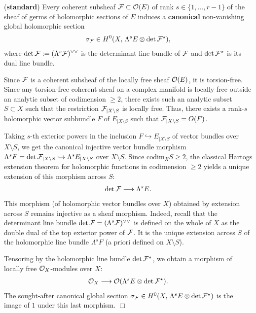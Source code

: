 \documentclass[12pt]{article}
\begin{document}
\begin{Fact} ({\bf standard})\label{Fact:canonical-section} Every coherent subsheaf ${\cal F}\subset{\cal O}(E)$ of rank $s\in\{1,\dots , r-1\}$ of the sheaf of germs of holomorphic sections of $E$ induces a {\bf canonical} non-vanishing global holomorphic section \begin{eqnarray*}\sigma_{{\cal F}}\in H^0(X,\,\Lambda^s E\otimes\det{\cal F}^\star),\end{eqnarray*} where $\det{\cal F}:=(\Lambda^s{\cal F})^{\vee\vee}$ is the determinant line bundle of ${\cal F}$ and $\det{\cal F}^\star$ is its dual line bundle.


\end{Fact}      

 Since ${\cal F}$ is a coherent subsheaf of the locally free sheaf ${\cal O}(E)$, it is torsion-free. Since any torsion-free coherent sheaf on a complex manifold is locally free outside an analytic subset of codimension $\geq 2$, there exists such an analytic subset $S\subset X$ such that the restriction ${\cal F}_{|X\setminus S}$ is locally free. Thus, there exists a rank-$s$ holomorphic vector subbundle $F$ of $E_{|X\setminus S}$ such that ${\cal F}_{|X\setminus S} = O(F)$.

Taking $s$-th exterior powers in the inclusion $F\hookrightarrow E_{|X\setminus S}$ of vector bundles over $X\setminus S$, we get the canonical injective vector bundle morphism $\Lambda^s F = \det{\cal F}_{|X\setminus S}\hookrightarrow\Lambda^sE_{|X\setminus S}$ over $X\setminus S$. Since $\mbox{codim}_X S\geq 2$, the classical Hartogs extension theorem for holomorphic functions in codimension $\geq 2$ yields a unique extension of this morphism across $S$: \begin{eqnarray*}\det{\cal F}\longrightarrow\Lambda^sE.\end{eqnarray*} This morphism (of holomorphic vector bundles over $X$) obtained by extension across $S$ remains injective as a sheaf morphism. Indeed, recall that the determinant line bundle $\det{\cal F} = (\Lambda^s{\cal F})^{\vee\vee}$ is defined on the whole of $X$ as the double dual of the top exterior power of ${\cal F}$. It is the unique extension across $S$ of the holomorphic line bundle $\Lambda^sF$ (a priori defined on $X\setminus S$).

Tensoring by the holomorphic line bundle $\det{\cal F}^\star$, we obtain a morphism of locally free ${\cal O}_X$-modules over $X$: \begin{eqnarray*}{\cal O}_X\longrightarrow{\cal O}(\Lambda^sE\otimes\det{\cal F}^\star).\end{eqnarray*} The sought-after canonical global section $\sigma_{{\cal F}}\in H^0(X,\,\Lambda^s E\otimes\det{\cal F}^\star)$ is the image of $1$ under this last morphism. \hfill $\Box$
\end{document}
